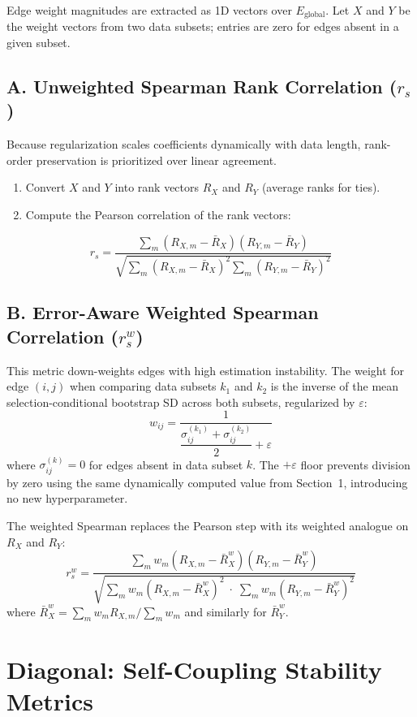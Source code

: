 \documentclass[11pt]{article}
\begin{document}
Edge weight magnitudes are extracted as 1D vectors over $E_{\text{global}}$. Let $X$ and $Y$ be the weight vectors from two data subsets; entries are zero for edges absent in a given subset.

\subsection*{A. Unweighted Spearman Rank Correlation ($r_s$)}

Because regularization scales coefficients dynamically with data length, rank-order preservation is prioritized over linear agreement.
\begin{enumerate}
    \item Convert $X$ and $Y$ into rank vectors $R_X$ and $R_Y$ (average ranks for ties).
    \item Compute the Pearson correlation of the rank vectors:
\end{enumerate}
\[
r_s = \frac{\sum_m (R_{X,m} - \bar{R}_X)(R_{Y,m} - \bar{R}_Y)}{\sqrt{\sum_m (R_{X,m} - \bar{R}_X)^2 \sum_m (R_{Y,m} - \bar{R}_Y)^2}}
\]

\subsection*{B. Error-Aware Weighted Spearman Correlation ($r_s^w$)}

This metric down-weights edges with high estimation instability. The weight for edge $(i,j)$ when comparing data subsets $k_1$ and $k_2$ is the inverse of the mean selection-conditional bootstrap SD across both subsets, regularized by $\varepsilon$:
\[
w_{ij} = \frac{1}{\dfrac{\sigma^{(k_1)}_{ij} + \sigma^{(k_2)}_{ij}}{2} + \varepsilon}
\]
where $\sigma^{(k)}_{ij} = 0$ for edges absent in data subset $k$. The $+\varepsilon$ floor prevents division by zero using the same dynamically computed value from Section~1, introducing no new hyperparameter.

The weighted Spearman replaces the Pearson step with its weighted analogue on $R_X$ and $R_Y$:
\[
r_s^w = \frac{\sum_m w_m (R_{X,m} - \bar{R}_X^w)(R_{Y,m} - \bar{R}_Y^w)}
             {\sqrt{\sum_m w_m (R_{X,m} - \bar{R}_X^w)^2 \;\cdot\; \sum_m w_m (R_{Y,m} - \bar{R}_Y^w)^2}}
\]
where $\bar{R}_X^w = \sum_m w_m R_{X,m} / \sum_m w_m$ and similarly for $\bar{R}_Y^w$.

\section{Diagonal: Self-Coupling Stability Metrics}
\label{sec:diagonal}
\end{document}
